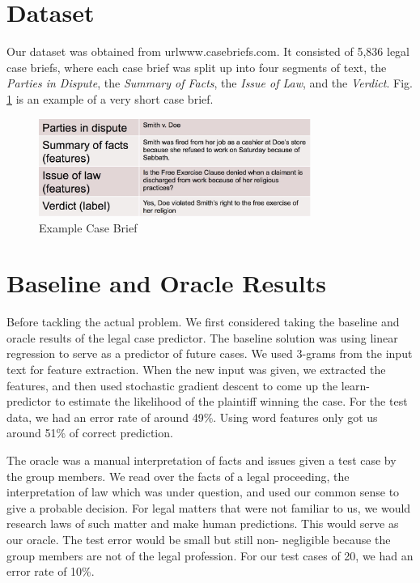 \documentclass[journal]{IEEEtran}
\begin{document}
\section{Dataset}

Our dataset was obtained from url{www.casebriefs.com}. It consisted of 5,836 legal case briefs, where each case brief was split up into four segments of text, the \textit{Parties in Dispute}, the \textit{Summary of Facts}, the \textit{Issue of Law}, and the \textit{Verdict}. Fig. \ref{ExampleCaseBrief} is  an example of a very short case brief.

\begin{figure}
    \centering
    \includegraphics[width=3.5in]{exampleCaseBrief.jpg}
    \caption{Example Case Brief}
    \label{ExampleCaseBrief}
\end{figure}

\section{Baseline and Oracle Results}
Before tackling the actual problem. We first considered taking the baseline and oracle results of the legal case predictor. The baseline solution was using linear regression to serve as a predictor of future cases. We used 3-grams from the input text for feature extraction.  When the new input was given, we extracted the features, and then used stochastic gradient descent to come up the learn-predictor to estimate the likelihood of the plaintiff winning the case. For the test data, we had an error rate of around 49\%. Using word features only got us around 51\% of correct prediction.

The oracle was a manual interpretation of facts and issues given a test case by the group members. We read over the facts of a legal proceeding, the interpretation of law which was under question, and used our common sense to give a probable decision. For legal matters that were not familiar to us, we would research laws of such matter and make human predictions. This would serve as our oracle. The test error would be small but still non- negligible because the group members are not of the legal profession. For our test cases of 20, we had an error rate of 10\%. 
\end{document}
